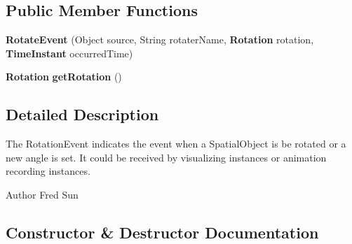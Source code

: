 \subsection*{Public Member Functions}
\begin{DoxyCompactItemize}
\item 
{\bf Rotate\-Event} (Object source, String rotater\-Name, {\bf Rotation} rotation, {\bf Time\-Instant} occurred\-Time)
\item 
{\bf Rotation} {\bf get\-Rotation} ()
\end{DoxyCompactItemize}


\subsection{Detailed Description}
The Rotation\-Event indicates the event when a Spatial\-Object is be rotated or a new angle is set. It could be received by visualizing instances or animation recording instances. \begin{DoxyAuthor}{Author}
Fred Sun 
\end{DoxyAuthor}


\subsection{Constructor \& Destructor Documentation}
